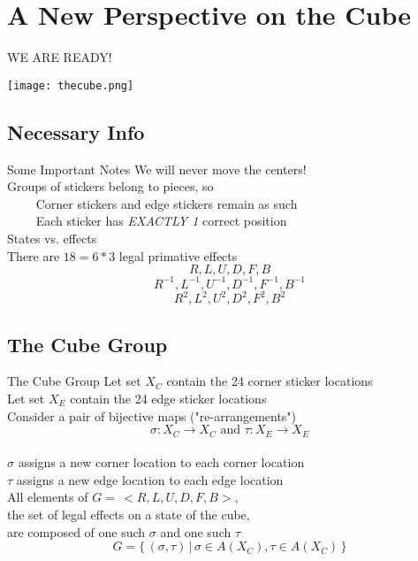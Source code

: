\documentclass{beamer}
\begin{document}
		\section{A New Perspective on the Cube}

				\begin{frame}{WE ARE READY!}
					\begin{center}
					\texttt{[image: thecube.png]}
					\end{center}
				\end{frame}

			\subsection{Necessary Info}

				\begin{frame}{Some Important Notes}
					We will never move the centers! \\[.3cm]
					Groups of stickers belong to pieces, so \\[.1cm]
					\( \quad \quad \) Corner stickers and edge stickers remain as such \\[.1cm]
					\( \quad \quad \) Each sticker has \emph{EXACTLY 1} correct position \\[.3cm]
					States vs. effects \\[.4cm]
					There are \( 18 = 6*3 \) legal primative effects
					\[R,L,U,D,F,B\]
					\[R^{-1},L^{-1},U^{-1},D^{-1},F^{-1},B^{-1}\]
					\[R^{2},L^{2},U^{2},D^{2},F^{2},B^{2}\]
				\end{frame}
			
			\subsection{The Cube Group}

				\begin{frame}{The Cube Group}
					Let set \(X_{C}\) contain the 24 corner sticker locations\\
					Let set \(X_{E}\) contain the 24 edge sticker locations\\[.3cm]
					Consider a pair of bijective maps ("re-arrangements")
					\[ \sigma : X_C \to X_C \text{  and  } \tau : X_E \to X_E \]  \\[.2cm]
					\( \sigma \) assigns a new corner location to each corner location \\
					\( \tau \) assigns a new edge location to each edge location \\[.2cm]
					All elements of \( G = \, <R,L,U,D,F,B> \), \\
					the set of legal effects on a state of the cube, \\
					are composed of one such \( \sigma \) and one such \( \tau \)
					\[ G = \{ \, (\sigma , \tau) \,| \,\sigma \in A(X_C), \tau \in A(X_C) \,\} \]
				\end{frame}
\end{document}
